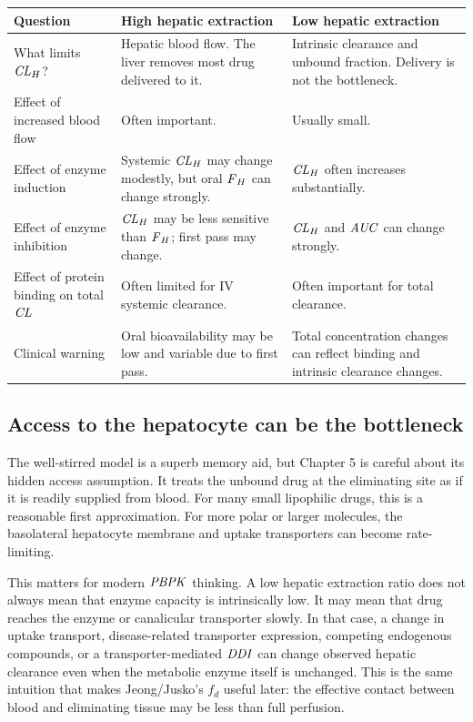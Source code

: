 \documentclass[a4paper]{article}
\newcommand{\CL}{\ensuremath{\pksym{CL}}}
\newcommand{\CLH}{\ensuremath{\pksym{CL}_{H}}}
\newcommand{\AUC}{\ensuremath{\pksym{AUC}}}
\newcommand{\Fh}{\ensuremath{\pksym{F}_H}}
\newcommand{\fd}{\ensuremath{f_d}}
\newcommand{\PBPK}{\ensuremath{\pksym{PBPK}}}
\newcommand{\DDI}{\ensuremath{\pksym{DDI}}}
\begin{document}
\begin{center}
\footnotesize
\begin{tabularx}{\textwidth}{p{}XX}
\toprule
Question & High hepatic extraction & Low hepatic extraction \\
\midrule
What limits \(\CLH\)? & Hepatic blood flow. The liver removes most drug delivered to it. & Intrinsic clearance and unbound fraction. Delivery is not the bottleneck. \\
Effect of increased blood flow & Often important. & Usually small. \\
Effect of enzyme induction & Systemic \(\CLH\) may change modestly, but oral \(\Fh\) can change strongly. & \(\CLH\) often increases substantially. \\
Effect of enzyme inhibition & \(\CLH\) may be less sensitive than \(\Fh\); first pass may change. & \(\CLH\) and \(\AUC\) can change strongly. \\
Effect of protein binding on total \(\CL\) & Often limited for IV systemic clearance. & Often important for total clearance. \\
Clinical warning & Oral bioavailability may be low and variable due to first pass. & Total concentration changes can reflect binding and intrinsic clearance changes. \\
\bottomrule
\end{tabularx}
\end{center}

\subsection{Access to the hepatocyte can be the bottleneck}

The well-stirred model is a superb memory aid, but Chapter 5 is careful about its hidden access assumption. It treats the unbound drug at the eliminating site as if it is readily supplied from blood. For many small lipophilic drugs, this is a reasonable first approximation. For more polar or larger molecules, the basolateral hepatocyte membrane and uptake transporters can become rate-limiting.

This matters for modern \PBPK{} thinking. A low hepatic extraction ratio does not always mean that enzyme capacity is intrinsically low. It may mean that drug reaches the enzyme or canalicular transporter slowly. In that case, a change in uptake transport, disease-related transporter expression, competing endogenous compounds, or a transporter-mediated \DDI{} can change observed hepatic clearance even when the metabolic enzyme itself is unchanged. This is the same intuition that makes Jeong/Jusko's \(\fd\) useful later: the effective contact between blood and eliminating tissue may be less than full perfusion.
\end{document}
